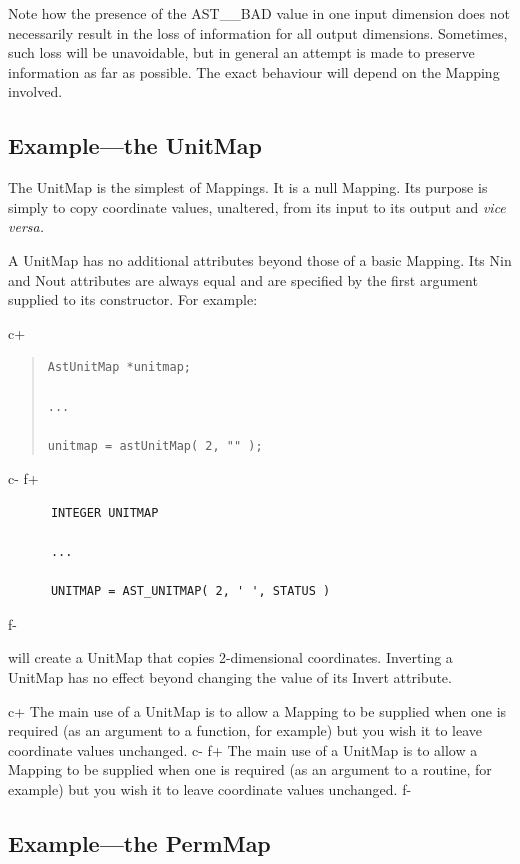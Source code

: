 \documentclass[twoside,11pt]{article}
\begin{document}
Note how the presence of the AST\_\_BAD value in one input dimension
does not necessarily result in the loss of information for all output
dimensions. Sometimes, such loss will be unavoidable, but in general
an attempt is made to preserve information as far as possible. The
exact behaviour will depend on the Mapping involved.

\subsection{\label{ss:unitmapexample}Example---the UnitMap}

The UnitMap is the simplest of Mappings. It is a null Mapping. Its
purpose is simply to copy coordinate values, unaltered, from its input
to its output and {\em{vice versa.}}

A UnitMap has no additional attributes beyond those of a basic
Mapping. Its Nin and Nout attributes are always equal and are
specified by the first argument supplied to its constructor. For
example:

c+
\begin{quote}
\small
\begin{verbatim}
AstUnitMap *unitmap;

...

unitmap = astUnitMap( 2, "" );
\end{verbatim}
\normalsize
\end{quote}
c-
f+
\small
\begin{verbatim}
      INTEGER UNITMAP

      ...

      UNITMAP = AST_UNITMAP( 2, ' ', STATUS )
\end{verbatim}
\normalsize
f-

will create a UnitMap that copies 2-dimensional coordinates. Inverting
a UnitMap has no effect beyond changing the value of its Invert
attribute.

c+
The main use of a UnitMap is to allow a Mapping to be supplied when one
is required (as an argument to a function, for example) but you wish
it to leave coordinate values unchanged.
c-
f+
The main use of a UnitMap is to allow a Mapping to be supplied when one
is required (as an argument to a routine, for example) but you wish
it to leave coordinate values unchanged.
f-

\subsection{\label{ss:permmapexample}Example---the PermMap}
\end{document}
